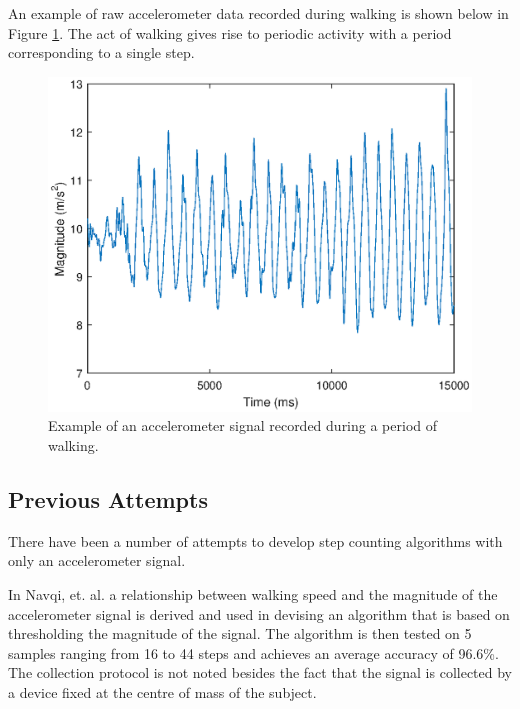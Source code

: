                 An example of raw accelerometer data recorded during walking is shown below in Figure \ref{img_accel_ex}. The act of walking gives rise to periodic activity with a period corresponding to a single step. 

                \begin{figure}[h]
                    \includegraphics[width=\textwidth]{Images/accel_signal.eps}
                    \centering
                    \caption{Example of an accelerometer signal recorded during a period of walking.}
                    \label{img_accel_ex}
                \end{figure}

            \subsection{Previous Attempts}

                There have been a number of attempts to develop step counting algorithms with only an accelerometer signal.

                In Navqi, et. al. \cite{navqi} a relationship between walking speed and the magnitude of the accelerometer signal is derived and used in devising an algorithm that is based on thresholding the magnitude of the signal. The algorithm is then tested on 5 samples ranging from 16 to 44 steps and achieves an average accuracy of 96.6\%. The collection protocol is not noted besides the fact that the signal is collected by a device fixed at the centre of mass of the subject.

